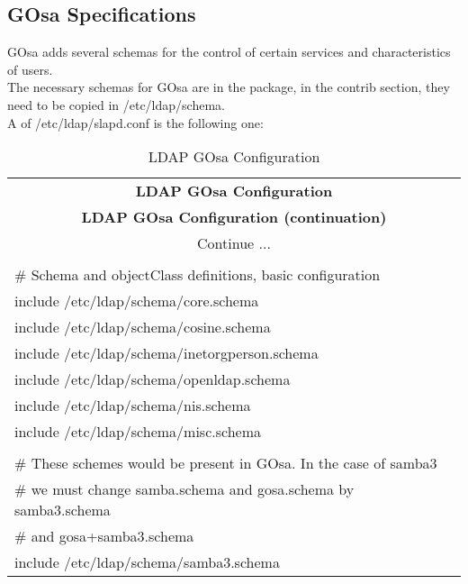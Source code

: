 \newpage
\subsection{GOsa Specifications}

GOsa adds several schemas for the control of certain services and characteristics of users. \\

The necessary schemas for GOsa are in the package, in the contrib section, they need to be copied in /etc/ldap/schema. \\

A  of /etc/ldap/slapd.conf is the following one: \\

\begin{center}
\begin{longtable}{|ll|}\hline
\caption{LDAP GOsa Configuration}\\
\hline \hline
\multicolumn{2}{|c|}{\textbf{LDAP GOsa Configuration}}\\
\hline \hline
\endfirsthead
\hline \hline
\multicolumn{2}{|c|}{\textbf{LDAP GOsa Configuration (continuation)}}\\
\hline \hline
\endhead
\hline
\multicolumn{2}{|c|}{Continue $\ldots$}\\
\hline
\endfoot
\hline
\multicolumn{2}{|c|}{\textbf{End}}\\
\hline
\endlastfoot
\# Schema and objectClass definitions, basic configuration & \\
include         /etc/ldap/schema/core.schema & \\
include         /etc/ldap/schema/cosine.schema & \\
include         /etc/ldap/schema/inetorgperson.schema & \\
include         /etc/ldap/schema/openldap.schema & \\
include         /etc/ldap/schema/nis.schema & \\
include         /etc/ldap/schema/misc.schema & \\
 & \\
\# These schemes would be present in GOsa. In the case of samba3 & \\
\# we must change samba.schema and gosa.schema by samba3.schema & \\
\# and gosa+samba3.schema & \\
include		/etc/ldap/schema/samba3.schema & \\

\end{longtable}
\end{center}
